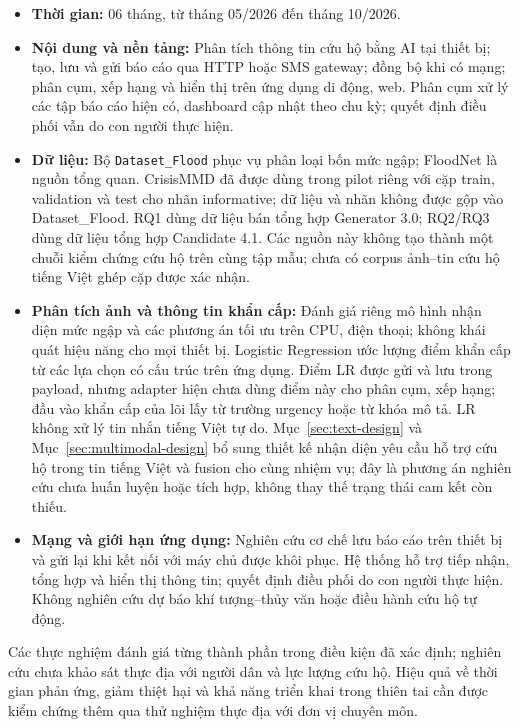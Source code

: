 \begin{itemize}
    \item \textbf{Thời gian:} 06 tháng, từ tháng 05/2026 đến tháng 10/2026.
    \item \textbf{Nội dung và nền tảng:} Phân tích thông tin cứu hộ bằng AI tại thiết bị; tạo, lưu và gửi báo cáo qua HTTP hoặc SMS gateway; đồng bộ khi có mạng; phân cụm, xếp hạng và hiển thị trên ứng dụng di động, web. Phân cụm xử lý các tập báo cáo hiện có, dashboard cập nhật theo chu kỳ; quyết định điều phối vẫn do con người thực hiện.
    \item \textbf{Dữ liệu:} Bộ \texttt{Dataset\_Flood} phục vụ phân loại bốn mức ngập; FloodNet là nguồn tổng quan. CrisisMMD đã được dùng trong pilot riêng với \MMTrainN{} cặp train, \MMDevN{} validation và \MMTestN{} test cho nhãn informative; dữ liệu và nhãn không được gộp vào Dataset\_Flood. RQ1 dùng dữ liệu bán tổng hợp Generator 3.0; RQ2/RQ3 dùng dữ liệu tổng hợp Candidate 4.1. Các nguồn này không tạo thành một chuỗi kiểm chứng cứu hộ trên cùng tập mẫu; chưa có corpus ảnh--tin cứu hộ tiếng Việt ghép cặp được xác nhận.
    \item \textbf{Phân tích ảnh và thông tin khẩn cấp:} Đánh giá riêng mô hình nhận diện mức ngập và các phương án tối ưu trên CPU, điện thoại; không khái quát hiệu năng cho mọi thiết bị. Logistic Regression ước lượng điểm khẩn cấp từ các lựa chọn có cấu trúc trên ứng dụng. Điểm LR được gửi và lưu trong payload, nhưng adapter hiện chưa dùng điểm này cho phân cụm, xếp hạng; đầu vào khẩn cấp của lõi lấy từ trường urgency hoặc từ khóa mô tả. LR không xử lý tin nhắn tiếng Việt tự do. Mục~\ref{sec:text-design} và Mục~\ref{sec:multimodal-design} bổ sung thiết kế nhận diện yêu cầu hỗ trợ cứu hộ trong tin tiếng Việt và fusion cho cùng nhiệm vụ; đây là phương án nghiên cứu chưa huấn luyện hoặc tích hợp, không thay thế trạng thái cam kết còn thiếu.
    \item \textbf{Mạng và giới hạn ứng dụng:} Nghiên cứu cơ chế lưu báo cáo trên thiết bị và gửi lại khi kết nối với máy chủ được khôi phục. Hệ thống hỗ trợ tiếp nhận, tổng hợp và hiển thị thông tin; quyết định điều phối do con người thực hiện. Không nghiên cứu dự báo khí tượng--thủy văn hoặc điều hành cứu hộ tự động.
\end{itemize}

Các thực nghiệm đánh giá từng thành phần trong điều kiện đã xác định; nghiên cứu chưa khảo sát thực địa với người dân và lực lượng cứu hộ. Hiệu quả về thời gian phản ứng, giảm thiệt hại và khả năng triển khai trong thiên tai cần được kiểm chứng thêm qua thử nghiệm thực địa với đơn vị chuyên môn.
